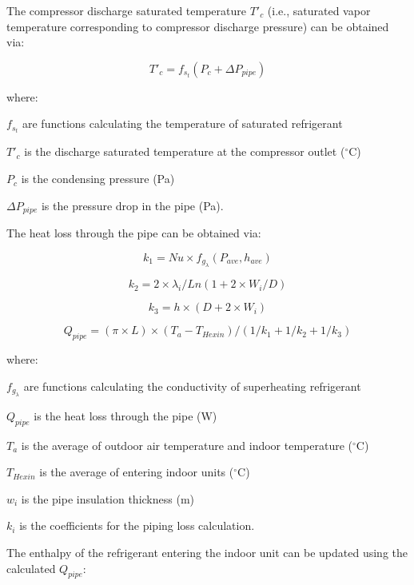 The compressor discharge saturated temperature \(T'_c\) (i.e., saturated vapor temperature corresponding to compressor discharge pressure) can be obtained via:

\begin{equation}
T'_c = f_{s_t}(P_c+\Delta{P_{pipe}})
\end{equation}

where:

\(f_{s_t}\) are functions calculating the temperature of saturated refrigerant

\(T'_c\) is the discharge saturated temperature at the compressor outlet (\(^{\circ}\)C)

\(P_c\) is the condensing pressure (Pa)

\(\Delta{P_{pipe}}\) is the pressure drop in the pipe (Pa).

The heat loss through the pipe can be obtained via:

\begin{equation}
k_1 = Nu\times{f_{g_\lambda}(P_{ave},h_{ave})}
\end{equation}

\begin{equation}
k_2 = 2\times{\lambda_i}/Ln(1+2\times{W_i}/D)
\end{equation}

\begin{equation}
k_3 = h\times(D+2\times{W_i})
\end{equation}

\begin{equation}
Q_{pipe} = (\pi\times{L})\times(T_a-T_{Hexin})/(1/k_1+1/k_2+1/k_3)
\end{equation}

where:

\(f_{g_\lambda}\) are functions calculating the conductivity of superheating refrigerant

\(Q_{pipe}\) is the heat loss through the pipe (W)

\(T_a\) is the average of outdoor air temperature and indoor temperature (\(^{\circ}\)C)

\(T_{Hexin}\) is the average of entering indoor units (\(^{\circ}\)C)

\(w_i\) is the pipe insulation thickness (m)

\(k_i\) is the coefficients for the piping loss calculation.

The enthalpy of the refrigerant entering the indoor unit can be updated using the calculated \(Q_{pipe}\):

